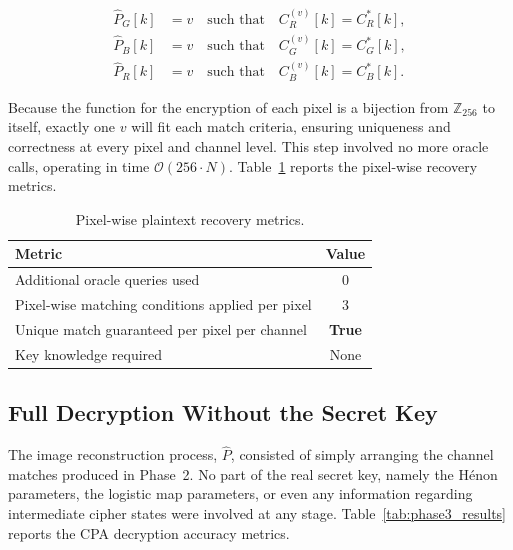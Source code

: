 \begin{align}
  \hat{P}_G[k] &= v \quad \text{such that} \quad C^{(v)}_R[k] = C^*_R[k], \label{eq:match_g}\\
  \hat{P}_B[k] &= v \quad \text{such that} \quad C^{(v)}_G[k] = C^*_G[k], \label{eq:match_b}\\
  \hat{P}_R[k] &= v \quad \text{such that} \quad C^{(v)}_B[k] = C^*_B[k]. \label{eq:match_r}
\end{align}

Because the function for the encryption of each pixel is a bijection from $\mathbb{Z}_{256}$ to itself, exactly one $v$ will fit each match criteria, ensuring uniqueness and correctness at every pixel and channel level. This step involved no more oracle calls, operating in time $\mathcal{O}(256 \cdot N)$. Table~\ref{tab:phase2_results} reports the pixel-wise recovery metrics.


\begin{table}[t]
\centering
\caption{Pixel-wise plaintext recovery metrics.}
\label{tab:phase2_results}
\begin{tabular}{lc}
\toprule
Metric & Value \\
\midrule
Additional oracle queries used                               & 0 \\
Pixel-wise matching conditions applied per pixel             & 3 \\
Unique match guaranteed per pixel per channel                & \textbf{True} \\
Key knowledge required                                       & None \\
\bottomrule
\end{tabular}
\end{table}

\subsection{Full Decryption Without the Secret Key}
\label{subsec:exp_phase3}

The image reconstruction process, $\hat{P}$, consisted of simply arranging the channel matches produced in Phase~2. No part of the real secret key, namely the Hénon parameters, the logistic map parameters, or even any information regarding intermediate cipher states were involved at any stage. Table~\ref{tab:phase3_results} reports the CPA decryption accuracy metrics.


